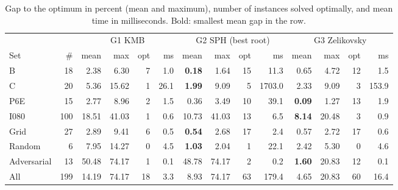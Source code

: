 \begin{table}[!htbp]\centering\small
\begin{tabular}{@{}lrrrrrrrrrrrrr@{}}\toprule
 & & \multicolumn{4}{c}{G1 KMB} & \multicolumn{4}{c}{G2 SPH (best root)} & \multicolumn{4}{c}{G3 Zelikovsky}\\
\cmidrule(lr){3-6}\cmidrule(lr){7-10}\cmidrule(l){11-14}
Set & \# & mean & max & opt & ms & mean & max & opt & ms & mean & max & opt & ms\\\midrule
B & 18 & 2.38 & 6.30 & 7 & 1.0 & \textbf{0.18} & 1.64 & 15 & 11.3 & 0.65 & 4.72 & 12 & 1.5\\
C & 20 & 5.36 & 15.62 & 1 & 26.1 & \textbf{1.99} & 9.09 & 5 & 1703.0 & 2.33 & 9.09 & 3 & 153.9\\
P6E & 15 & 2.77 & 8.96 & 2 & 1.5 & 0.36 & 3.49 & 10 & 39.1 & \textbf{0.09} & 1.27 & 13 & 1.9\\
I080 & 100 & 18.51 & 41.03 & 1 & 0.6 & 10.73 & 41.03 & 13 & 6.5 & \textbf{8.14} & 20.48 & 3 & 0.9\\
Grid & 27 & 2.89 & 9.41 & 6 & 0.5 & \textbf{0.54} & 2.68 & 17 & 2.4 & 0.57 & 2.72 & 17 & 0.6\\
Random & 6 & 7.95 & 14.27 & 0 & 4.5 & \textbf{1.03} & 2.04 & 1 & 22.1 & 2.42 & 5.30 & 0 & 4.6\\
Adversarial & 13 & 50.48 & 74.17 & 1 & 0.1 & 48.78 & 74.17 & 2 & 0.2 & \textbf{1.60} & 20.83 & 12 & 0.1\\
\midrule All & 199 & 14.19 & 74.17 & 18 & 3.3 & 8.93 & 74.17 & 63 & 179.4 & 4.65 & 20.83 & 60 & 16.4\\
\bottomrule\end{tabular}
\caption{Gap to the optimum in percent (mean and maximum), number of instances solved optimally, and mean time in milliseconds. Bold: smallest mean gap in the row.}\label{tab:gaps}
\end{table}
